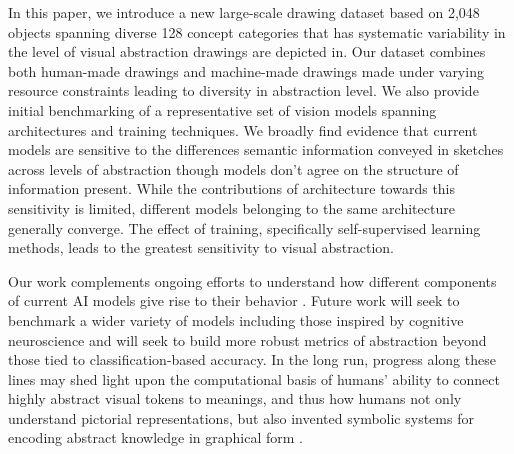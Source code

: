 \documentclass[10pt,letterpaper]{article}
\begin{document}
In this paper, we introduce a new large-scale drawing dataset based on 2,048 objects spanning diverse 128 concept categories that has systematic variability in the level of visual abstraction drawings are depicted in.
Our dataset combines both human-made drawings and machine-made drawings made under varying resource constraints leading to diversity in abstraction level.
We also provide initial benchmarking of a representative set of vision models spanning architectures and training techniques. We broadly find evidence that current models are sensitive to the differences semantic information conveyed in sketches across levels of abstraction though models don't agree on the structure of information present.
While the contributions of architecture towards this sensitivity is limited, different models belonging to the same architecture generally converge.
The effect of training, specifically self-supervised learning methods, leads to the greatest sensitivity to visual abstraction.

Our work complements ongoing efforts to understand how different components of current AI models give rise to their behavior \cite{hermann2020shapes, nguyen2020wide,schott2021visual,chen2021intriguing}. 
Future work will seek to benchmark a wider variety of models including those inspired by cognitive neuroscience \cite{chen2022unsupervised, zhuang2021unsupervised,kubilius2019brain} and will seek to build more robust metrics of abstraction beyond those tied to classification-based accuracy.
In the long run, progress along these lines may shed light upon the computational basis of humans' ability to connect highly abstract visual tokens to meanings, and thus how humans not only understand pictorial representations, but also invented symbolic systems for encoding abstract knowledge in graphical form \cite{schmandt2010writing, chrisomalis2020reckonings}. 





\setlength{\bibleftmargin}{.125in}
\setlength{\bibindent}{-\bibleftmargin}
\newpage

\end{document}
